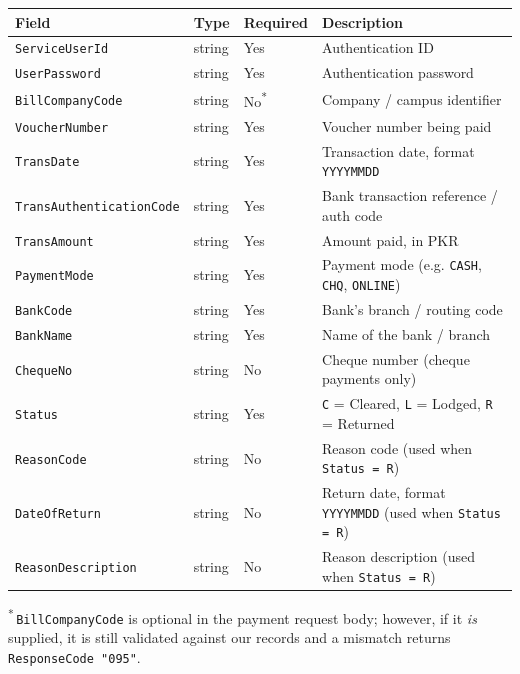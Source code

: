 \documentclass[11pt]{article}
\begin{document}
\begin{center}
\begin{tabular}{@{}llll@{}}
\toprule
\textbf{Field} & \textbf{Type} & \textbf{Required} & \textbf{Description} \\
\midrule
\texttt{ServiceUserId} & string & Yes & Authentication ID \\
\texttt{UserPassword} & string & Yes & Authentication password \\
\texttt{BillCompanyCode} & string & No\textsuperscript{*} & Company / campus identifier \\
\texttt{VoucherNumber} & string & Yes & Voucher number being paid \\
\texttt{TransDate} & string & Yes & Transaction date, format \texttt{YYYYMMDD} \\
\texttt{TransAuthenticationCode} & string & Yes & Bank transaction reference / auth code \\
\texttt{TransAmount} & string & Yes & Amount paid, in PKR \\
\texttt{PaymentMode} & string & Yes & Payment mode (e.g. \texttt{CASH}, \texttt{CHQ}, \texttt{ONLINE}) \\
\texttt{BankCode} & string & Yes & Bank's branch / routing code \\
\texttt{BankName} & string & Yes & Name of the bank / branch \\
\texttt{ChequeNo} & string & No & Cheque number (cheque payments only) \\
\texttt{Status} & string & Yes & \texttt{C} = Cleared, \texttt{L} = Lodged, \texttt{R} = Returned \\
\texttt{ReasonCode} & string & No & Reason code (used when \texttt{Status = R}) \\
\texttt{DateOfReturn} & string & No & Return date, format \texttt{YYYYMMDD} (used when \texttt{Status = R}) \\
\texttt{ReasonDescription} & string & No & Reason description (used when \texttt{Status = R}) \\
\bottomrule
\end{tabular}
\end{center}
\noindent\textsuperscript{*}\,\texttt{BillCompanyCode} is optional in the payment request body;
however, if it \emph{is} supplied, it is still validated against our records and a mismatch
returns \texttt{ResponseCode "095"}.
\end{document}

